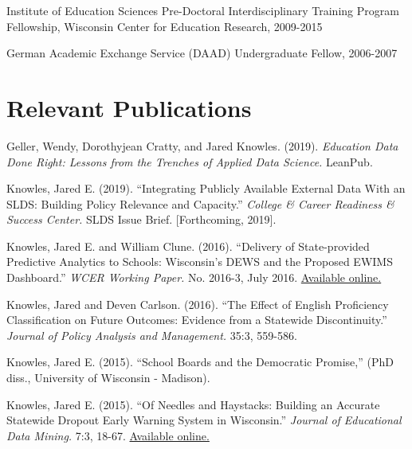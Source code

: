 \documentclass[margin,line]{res}
\begin{document}
\begin{resume}
\vspace*{-2.5mm}

Institute of Education Sciences Pre-Doctoral Interdisciplinary Training Program 
Fellowship, Wisconsin Center for Education Research, 2009-2015

\vspace*{-2.5mm}
German Academic Exchange Service (DAAD) Undergraduate Fellow, 2006-2007

\vspace*{-3mm}
\section{\sc Relevant Publications}

Geller, Wendy, Dorothyjean Cratty, and Jared Knowles. (2019). \emph{Education Data Done Right: Lessons from the Trenches of Applied Data Science.} LeanPub.

Knowles, Jared E. (2019). ``Integrating Publicly Available External Data With an SLDS: Building 
Policy Relevance and Capacity.'' \emph{College & Career Readiness & Success Center.} 
SLDS Issue Brief. [Forthcoming, 2019].

Knowles, Jared E. and William Clune. (2016). ``Delivery of State-provided Predictive
Analytics to Schools: Wisconsin’s DEWS and the Proposed EWIMS Dashboard.'' 
\emph{WCER Working Paper.} No. 2016-3, July 2016. \href{http://wcer-web.ad.education.wisc.edu/docs/working-papers/Working_Paper_No_2016_03.pdf}{Available online.}

Knowles, Jared and Deven Carlson. (2016). ``The Effect of English Proficiency Classification on Future Outcomes: 
Evidence from a Statewide Discontinuity.'' \emph{Journal of Policy Analysis and Management.}
35:3, 559-586. 

Knowles, Jared E. (2015). ``School Boards and the Democratic Promise,'' (PhD diss., University of 
Wisconsin - Madison).

Knowles, Jared E. (2015). ``Of Needles and Haystacks: Building an Accurate Statewide 
Dropout Early Warning System in Wisconsin.'' \emph{Journal of Educational Data 
Mining.} 7:3, 18-67. 
\href{http://www.educationaldatamining.org/JEDM/index.php/JEDM/article/view/JEDM082}{Available online.}
% 
% 
% 
% 


\end{resume}
\end{document}
